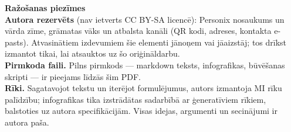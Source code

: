 \clearpage
\thispagestyle{empty}
\begin{flushleft}\small\sffamily
\textbf{Ražošanas piezīmes}\\[1.2em]

\textbf{Autora rezervēts} (nav ietverts CC BY-SA licencē): Personix nosaukums
un vārda zīme, grāmatas vāks un atbalsta kanāli (QR kodi, adreses, kontakta
e-pasts). Atvasinātiem izdevumiem šie elementi jānoņem vai jāaizstāj; tos drīkst
izmantot tikai, lai atsauktos uz šo oriģināldarbu.\\[1.2em]

\textbf{Pirmkoda faili.} Pilns pirmkods --- markdown teksts, infografikas,
būvēšanas skripti --- ir pieejams līdzās šim PDF.\\[1.2em]

\textbf{Rīki.} Sagatavojot tekstu un iterējot formulējumus, autors izmantoja
MI rīku palīdzību; infografikas tika izstrādātas sadarbībā ar ģeneratīviem
rīkiem, balstoties uz autora specifikācijām. Visas idejas, argumenti un
secinājumi ir autora paša.
\end{flushleft}
\clearpage
